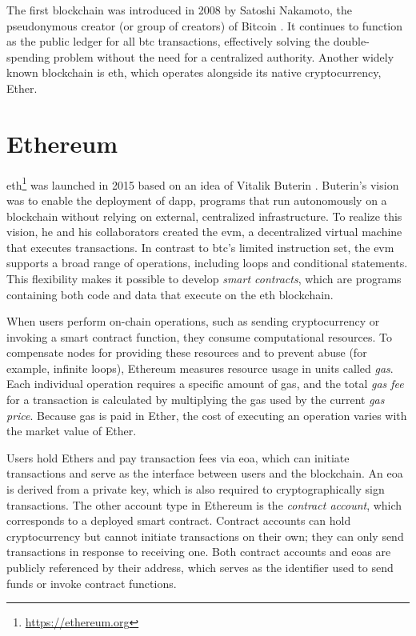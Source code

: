 The first blockchain was introduced in 2008 by Satoshi Nakamoto, the pseudonymous creator (or group of creators) of Bitcoin \cite{nakamoto2008bitcoin}. It continues to function as the public ledger for all \acrlong{btc} transactions, effectively solving the \gls{double-spending} problem without the need for a centralized authority. Another widely known blockchain is \acrfull{eth}, which operates alongside its native cryptocurrency, Ether.

\section{Ethereum}
\acrlong{eth}\footnote{\url{https://ethereum.org}} was launched in 2015 based on an idea of Vitalik Buterin \cite{buterin2014next}\cite{wood2014ethereum}. Buterin's vision was to enable the deployment of \acrfull{dapp}, programs that run autonomously on a blockchain without relying on external, centralized infrastructure. To realize this vision, he and his collaborators created the \acrfull{evm}, a decentralized virtual machine that executes transactions. In contrast to \acrlong{btc}'s limited instruction set, the \acrshort{evm} supports a broad range of operations, including loops and conditional statements. This flexibility makes it possible to develop \textit{smart contracts}, which are programs containing both code and data that execute on the \acrlong{eth} blockchain.

When users perform on-chain operations, such as sending cryptocurrency or invoking a smart contract function, they consume computational resources. To compensate nodes for providing these resources and to prevent abuse (for example, infinite loops), Ethereum measures resource usage in units called \textit{gas}. Each individual operation requires a specific amount of gas, and the total \textit{gas fee} for a transaction is calculated by multiplying the gas used by the current \textit{gas price}. Because gas is paid in Ether, the cost of executing an operation varies with the market value of Ether.

Users hold Ethers and pay transaction fees via \acrfull{eoa}, which can initiate transactions and serve as the interface between users and the blockchain. An \acrshort{eoa} is derived from a private key, which is also required to cryptographically sign transactions. The other account type in Ethereum is the \textit{contract account}, which corresponds to a deployed smart contract. Contract accounts can hold cryptocurrency but cannot initiate transactions on their own; they can only send transactions in response to receiving one. Both contract accounts and \acrshort{eoa}s are publicly referenced by their address, which serves as the identifier used to send funds or invoke contract functions.

